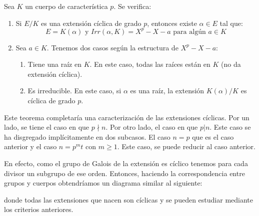 \begin{theorem}
Sea $K$ un cuerpo de característica $p$. Se verifica:

\begin{enumerate}
\item Si $E/K$ es una extensión cíclica de grado $p$, entonces existe $\alpha \in E$ tal que: $$E = K(\alpha) \text{ y } Irr(\alpha,K) = X^p-X-a \text{ para algún } a \in K$$ 
\item Sea $a \in K$. Tenemos dos casos según la estructura de $X^p-X-a$:

\begin{enumerate}
\item Tiene una raíz en $K$. En este caso, todas las raíces están en $K$ (no da extensión cíclica).
\item Es irreducible. En este caso, si $\alpha$ es una raíz, la extensión $K(\alpha)/K$ es cíclica de grado $p$.
\end{enumerate}
\end{enumerate}
\end{theorem}

Este teorema completaría una caracterización de las extensiones cíclicas. Por un lado, se tiene el caso en que $p \nmid n$. Por otro lado, el caso en que $p|n$. Este caso se ha disgregado implícitamente en dos subcasos. El caso $n = p$ que es el caso anterior y el caso $n = p^mt$ con $m \ge 1$. Este caso, se puede reducir al caso anterior.

En efecto, como el grupo de Galois de la extensión es cíclico tenemos para cada divisor un subgrupo de ese orden. Entonces, haciendo la correspondencia entre grupos y cuerpos obtendríamos un diagrama similar al siguiente:


donde todas las extensiones que nacen son cíclicas y se pueden estudiar mediante los criterios anteriores. 









